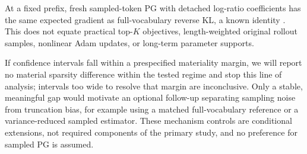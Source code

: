 At a fixed prefix, fresh sampled-token PG with detached log-ratio coefficients
has the same expected gradient as full-vocabulary reverse KL, a known identity
\citep{yu2026denseupdates,oh2026vopd}. This does not equate practical top-$K$
objectives, length-weighted original rollout samples, nonlinear Adam updates,
or long-term parameter supports.

If confidence intervals fall within a prespecified materiality margin, we
will report no material sparsity difference within the tested regime and
stop this line of analysis; intervals too wide to resolve that margin are
inconclusive. Only a stable, meaningful gap would motivate an optional
follow-up separating sampling noise from truncation bias, for example using
a matched full-vocabulary reference or a variance-reduced sampled estimator.
These mechanism controls are conditional extensions, not required components
of the primary study, and no preference for sampled PG is assumed.
